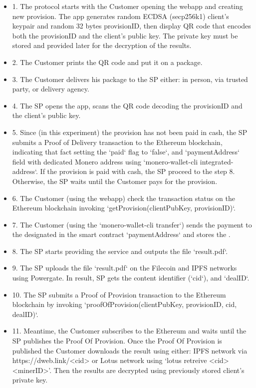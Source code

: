 \documentclass{ieeeaccess}
\begin{document}
\begin{itemize}
  \item 1. The protocol starts with the Customer opening the webapp and creating new provision. 
The app generates random ECDSA (secp256k1) client's keypair and random 32 bytes provisionID, then display QR code that encodes both the provisionID and the client's public key. 
The private key must be stored and provided later for the decryption of the results.

  \item 2. The Customer prints the QR code and put it on a package.

  \item 3. The Customer delivers his package to the SP either: in person, via trusted party, or delivery agency.

  \item 4. The SP opens the app, scans the QR code decoding the provisionID and the client's public key.

  \item 5. Since (in this experiment) the provision has not been paid in cash, the SP submits a Proof of Delivery transaction to the Ethereum blockchain, indicating that fact setting the `paid` flag to `false`, and `paymentAddress` field with dedicated Monero address using `monero-wallet-cli integrated-address`.
 If the provision is paid with cash, the SP proceed to the step 8. Otherwise, the SP waits until the Customer pays for the provision.

  \item 6. The Customer (using the webapp) check the transaction status on the Ethereum blockchain invoking `getProvision(clientPubKey, provisionID)`.

  \item 7. The Customer (using the `monero-wallet-cli transfer`) sends the payment to the designated in the smart contract `paymentAddress` and stores the .

  \item 8. The SP starts providing the service and outputs the file `result.pdf`.

  \item 9. The SP uploads the file `result.pdf` on the Filecoin and IPFS networks using Powergate. In result, SP gets the content identifier (`cid`), and `dealID`.

  \item 10. The SP submits a Proof of Provision transaction to the Ethereum blockchain by invoking `proofOfProvision(clientPubKey, provisionID, cid, dealID)`.

  \item 11. Meantime, the Customer subscribes to the Ethereum and waits until the SP publishes the Proof Of Provision.
 Once the Proof Of Provision is published the Customer downloads the result using either: IPFS network via https://dweb.link/<cid> or Lotus network using `lotus retreive <cid> <minerID>'. Then the results are decrypted using previously stored client's private key.

\end{itemize}
\end{document}
